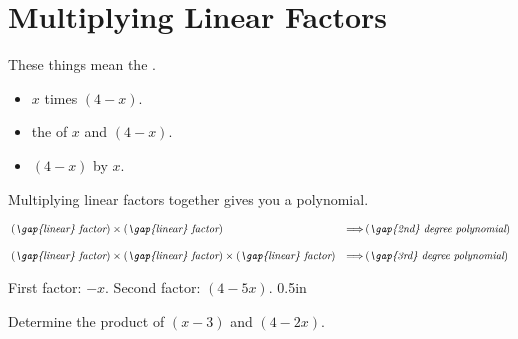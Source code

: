 \section{Multiplying Linear Factors}

\begin{tcolorbox}[center,colback=white,width=4in,]
    \small
    These things mean the .
    \begin{itemize}
        \item {} $x$ times $(4-x)$.
        \item {} the  of $x$ and $(4-x)$.
        \item {} $(4-x)$ by $x$.
    \end{itemize}
\end{tcolorbox}


Multiplying linear factors together gives you a
  polynomial.

\begin{tcolorbox}[center,colback=white,width=7in]
    \small\vspace{-1em}
    \begin{align*}
        &\left( \text{\itshape \gap{linear} factor} \right) 
        \times 
        \left( \text{\itshape \gap{linear} factor} \right) 
        &\Longrightarrow 
        &\left( \text{\itshape \gap{2nd} degree polynomial} \right) 
        \\[1em]
        &\left( \text{\itshape \gap{linear} factor} \right) 
        \times 
        \left( \text{\itshape \gap{linear} factor} \right) 
        \times 
        \left( \text{\itshape \gap{linear} factor} \right) 
        &\Longrightarrow 
        &\left( \text{\itshape \gap{3rd} degree polynomial} \right) 
    \end{align*}
\end{tcolorbox}

\vspace{-0.5em}
{
    First factor: $-x$. 
    \hfill
    Second factor: $(4 - 5x)$.
}
{0.5in}

{
    Determine the product of $(x-3)$ and $(4-2x)$.
    \tcblower
    \vspace{1.2in}
}
